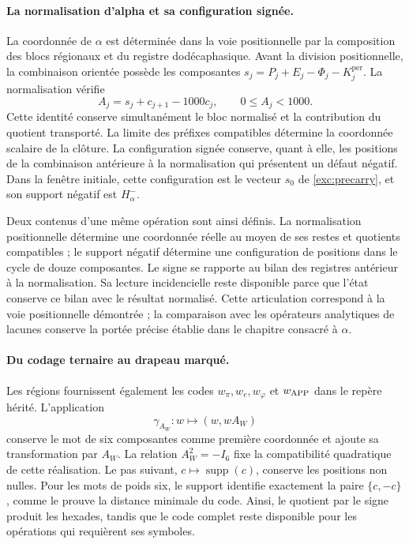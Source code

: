 \paragraph{La normalisation d'alpha et sa configuration signée.}
\label{inc-ampl-clausura}
La coordonnée de $\alpha$ est déterminée dans la voie positionnelle par la
composition des blocs régionaux et du registre dodécaphasique. Avant
la division positionnelle, la combinaison orientée possède les composantes
$s_j=P_j+E_j-\Phi_j-K_j^{\mathrm{per}}$. La normalisation vérifie
\begin{equation}
 A_j=s_j+c_{j+1}-1000c_j,\qquad 0\leq A_j<1000.
 \label{inc-ampl-normalizacion}
\end{equation}
Cette identité conserve simultanément le bloc normalisé et la
contribution du quotient transporté. La limite des préfixes
compatibles détermine la coordonnée scalaire de la clôture. La
configuration signée conserve, quant à elle, les positions de la
combinaison antérieure à la normalisation qui présentent un défaut négatif.
Dans la fenêtre initiale, cette configuration est le vecteur $s_0$ de
\eqref{exc:precarry}, et son support négatif est $H^-_\alpha$.

Deux contenus d'une même opération sont ainsi définis. La
normalisation positionnelle détermine une coordonnée réelle au moyen de ses
restes et quotients compatibles ; le support négatif détermine une
configuration de positions dans le cycle de douze composantes. Le signe
se rapporte au bilan des registres antérieur à la normalisation. Sa lecture
incidencielle reste disponible parce que l'état conserve ce bilan
avec le résultat normalisé. Cette articulation correspond à la
voie positionnelle démontrée ; la comparaison avec les opérateurs analytiques
de lacunes conserve la portée précise établie dans le chapitre
consacré à $\alpha$.

\paragraph{Du codage ternaire au drapeau marqué.}
\label{inc-ampl-bandera}
Les régions fournissent également les codes $w_\pi,w_e,w_\varphi$ et
$w_{\rm APP}$ dans le repère hérité. L'application
\[
 \gamma_{A_W}:w\longmapsto(w,wA_W)
\]
conserve le mot de six composantes comme première coordonnée et ajoute
sa transformation par $A_W$. La relation $A_W^2=-I_6$ fixe la
compatibilité quadratique de cette réalisation. Le pas suivant,
$c\mapsto\operatorname{supp}(c)$, conserve les positions non nulles.
Pour les mots de poids six, le support identifie exactement la paire
$\{c,-c\}$, comme le prouve la distance minimale du code. Ainsi,
le quotient par le signe produit les hexades, tandis que le code complet
reste disponible pour les opérations qui requièrent ses symboles.

